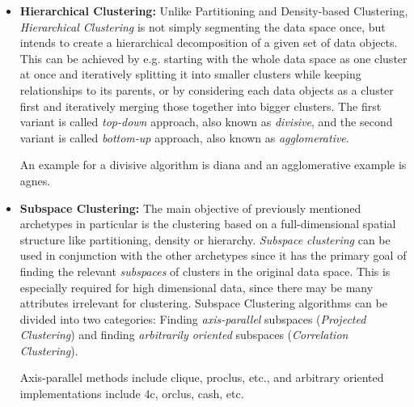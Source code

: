 \begin{itemize}
    \item \textbf{Hierarchical Clustering:} Unlike Partitioning and Density-based Clustering, \textit{Hierarchical Clustering} is not simply segmenting the data space once, but intends to create a hierarchical decomposition of a given set of data objects. This can be achieved by e.g. starting with the whole data space as one cluster at once and iteratively splitting it into smaller clusters while keeping relationships to its parents, or by considering each data objects as a cluster first and iteratively merging those together into bigger clusters. The first variant is called \textit{top-down} approach, also known as \textit{divisive}, and the second variant is called \textit{bottom-up} approach, also known as \textit{agglomerative}\cite[Chapter 10.3]{han2011data}. 
    
    An example for a divisive algorithm is \acrshort{diana}\cite[Chapter 6]{kaufman2009finding} and an agglomerative example is \acrshort{agnes}\cite[Chapter 5]{kaufman2009finding}.
    
    
    \item \textbf{Subspace Clustering:} The main objective of previously mentioned archetypes in particular is the clustering based on a full-dimensional spatial structure like partitioning, density or hierarchy. \textit{Subspace clustering} can be used in conjunction with the other archetypes since it has the primary goal of finding the relevant \textit{subspaces} of clusters in the original data space. This is especially required for high dimensional data, since there may be many attributes irrelevant for clustering\cite{vidal2011subspace}. 
    Subspace Clustering algorithms can be divided into two categories: Finding \textit{axis-parallel} subspaces (\textit{Projected Clustering}) and finding \textit{arbitrarily oriented} subspaces (\textit{Correlation Clustering})\cite{zimek2009correlation}.
    
    Axis-parallel methods include \acrshort{clique}\cite{cliqueagrawal1998automatic}, \acrshort{proclus}\cite{proclusaggarwal1999fast}, etc., and arbitrary oriented implementations include \acrshort{4c}\cite{4cbohm2004computing}, \acrshort{orclus}\cite{orclusaggarwal2000finding}, \acrshort{cash}\cite{CASHachtert2008global}, etc.
\end{itemize}

